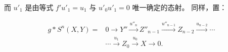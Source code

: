 \begin{center}
\end{center}
而 $u'_1$ 是由等式 $f'u'_1=u_1$ 与 $u'_0u'_1=0$ 唯一确定的态射。
同样，置：

\begin{equation}
\begin{aligned}
g*S^n(X,Y)={}&0\longrightarrow Y''\xrightarrow{u''_n}Z''_{n-1}
\xrightarrow{u''_{n-1}}Z_{n-2}\xrightarrow{u_{n-2}}\cdots\\
&\cdots\xrightarrow{u_1}Z_0\xrightarrow{u_0}X\longrightarrow0.
\end{aligned}
\tag{3.2.8.2}
\end{equation}
\endgroup
